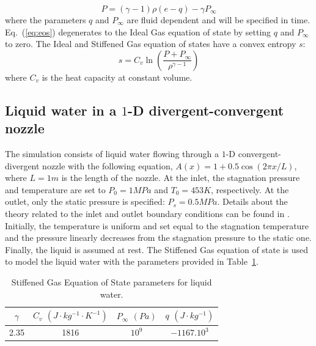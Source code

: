 \documentclass[preprint,10pt]{elsarticle}
\newcommand{\eqt}[1]{Eq.~(\ref{#1})}                     %
\newcommand{\tbl}[1]{Table~\ref{#1}}                     %
\begin{document}
\begin{equation}
\label{eq:eos}
P = (\gamma-1) \rho (e-q) - \gamma P_{\infty}
\end{equation}
where the parameters $q$ and $P_{\infty}$ are fluid dependent and will be specified in time. \eqt{eq:eos} degenerates to the Ideal Gas equation of state by setting $q$ and $P_{\infty}$ to zero. The Ideal and Stiffened Gas equation of states have a convex entropy $s$:
\begin{equation}
s = C_v \ln \left( \frac{P+P_{\infty}}{\rho^{\gamma-1}} \right) \nonumber
\end{equation}
where $C_v$ is the heat capacity at constant volume.
\subsection{Liquid water in a $1$-D divergent-convergent nozzle} \label{sec:liquid_nozzle}
The simulation consists of liquid water flowing through a $1$-D convergent-divergent nozzle with the following equation, $A(x) = 1 + 0.5 \cos(2 \pi x / L)$, where $L=1m$ is the length of the nozzle. At the inlet,  the stagnation pressure and temperature are set to $P_0 = 1 MPa$ and $T_0 = 453 K$, respectively. At the outlet, only the static pressure is specified: $P_s = 0.5MPa$. Details about the theory related to the inlet and outlet boundary conditions can be found in \cite{SEM}. Initially, the temperature is uniform and set equal to the stagnation temperature and the pressure linearly decreases from the stagnation pressure to the static one. Finally, the liquid is assumed at rest. The Stiffened Gas equation of state is used to model the liquid water with the parameters provided in \tbl{tbl:stff_gas_eos_liq}.
\begin{table}[H]
\begin{center}
 \caption{\label{tbl:stff_gas_eos_liq} Stiffened Gas Equation of State parameters for liquid water.}
 \begin{tabular}{|c|c|c|c|}
 \hline
$\gamma$ & $C_v$ $(J\cdot kg^{-1} \cdot K^{-1})$ & $P_{\infty}$ $(Pa)$ & $q$ $(J \cdot kg^{-1})$ \\
 \hline
2.35 & 1816 & $10^9$ & $-1167.10^3$   \\
  \hline
\end{tabular}
\end{center}
\end{table}
\end{document}
